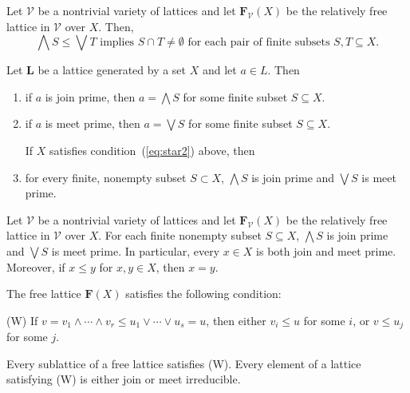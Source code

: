 {\begin{lemma}
Let $\mathcal{V}$ be a nontrivial variety of lattices and let $\mathbf{F}_{\mathcal V}(X)$ be the relatively free lattice in $\mathcal V$ over $X$.  Then,
\begin{equation}
  \label{eq:star2}
\bigwedge S \leqslant \bigvee T \text{ implies }S \cap T \neq \emptyset
\text{ for each pair of finite subsets $S, T \subseteq X$.}
\end{equation}
\end{lemma}

\begin{lemma}
Let $\mathbf L$ be a lattice generated by a set $X$ and let $a \in L$.  Then 
\begin{enumerate}
\item 
if $a$ is join prime, then $a = \bigwedge S$ for some finite subset $S \subseteq X$.
\item if $a$ is meet prime, then $a = \bigvee S$ for some finite subset $S \subseteq X$.

If $X$ satisfies condition~(\ref{eq:star2}) above, then 
\item for every finite, nonempty subset $S \subset X$, $\bigwedge S$ is join prime and $\bigvee S$ is meet prime.
\end{enumerate}
\end{lemma}

\begin{corollary}
Let $\mathcal V$ be a nontrivial variety of lattices and let $\mathbf{F}_{\mathcal V}(X)$ be the relatively free lattice in $\mathcal V$ over $X$.  For each finite nonempty subset $S \subseteq X$, $\bigwedge S$ is join prime and $\bigvee S$ is meet prime. In particular, every $x\in X$ is both join and meet prime.  Moreover, if $x\leqslant y$ for $x, y \in X$, then $x = y$.
\end{corollary}

\begin{theorem}  
The free lattice $\mathbf{F}(X)$ satisfies the following condition:

(W)  If $v = v_1 \wedge \cdots \wedge v_r \leqslant u_1 \vee \cdots \vee u_s = u$, 
then either $v_i \leqslant u$ for some $i$, or $v \leqslant u_j$ for some $j$. 
\end{theorem}

\begin{corollary}
Every sublattice of a free lattice satisfies (W). Every element of a lattice satisfying (W) is either join or meet irreducible.
\end{corollary}

}
